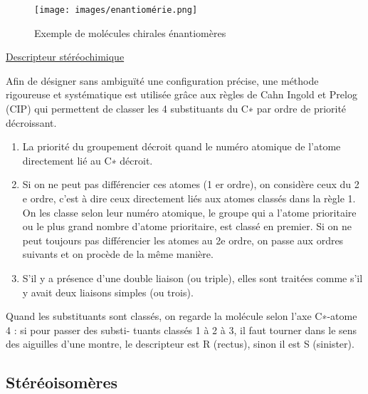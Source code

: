 \documentclass{article}%
\begin{document}
\begin{figure}
	\centerline{\texttt{[image: images/enantiomérie.png]}}
	\caption{Exemple de molécules chirales énantiomères}
\end{figure}


\underline{Descripteur stéréochimique}

Afin de désigner sans ambiguïté une configuration précise, une méthode rigoureuse et systématique est
utilisée grâce aux règles de Cahn Ingold et Prelog (CIP) qui permettent de classer les 4 substituants du C∗ par
ordre de priorité décroissant.
\begin{enumerate}
	\item La priorité du groupement décroit quand le numéro atomique de l’atome directement lié au C∗ décroit.
\item Si on ne peut pas différencier ces atomes (1 er ordre), on considère ceux du 2 e ordre, c’est à dire ceux
directement liés aux atomes classés dans la règle 1. On les classe selon leur numéro atomique, le groupe
qui a l’atome prioritaire ou le plus grand nombre d’atome prioritaire, est classé en premier. Si on ne peut
toujours pas différencier les atomes au 2e ordre, on passe aux ordres suivants et on procède de la même
manière.
\item S’il y a présence d’une double liaison (ou triple), elles sont traitées comme s’il y avait deux liaisons
simples (ou trois).
\end{enumerate}
Quand les substituants sont classés, on regarde la molécule selon l’axe C∗-atome 4 : si pour passer des substi-
tuants classés 1 à 2 à 3, il faut tourner dans le sens des aiguilles d’une montre, le descripteur est R (rectus),
sinon il est S (sinister).

\subsection{Stéréoisomères}
\end{document}
